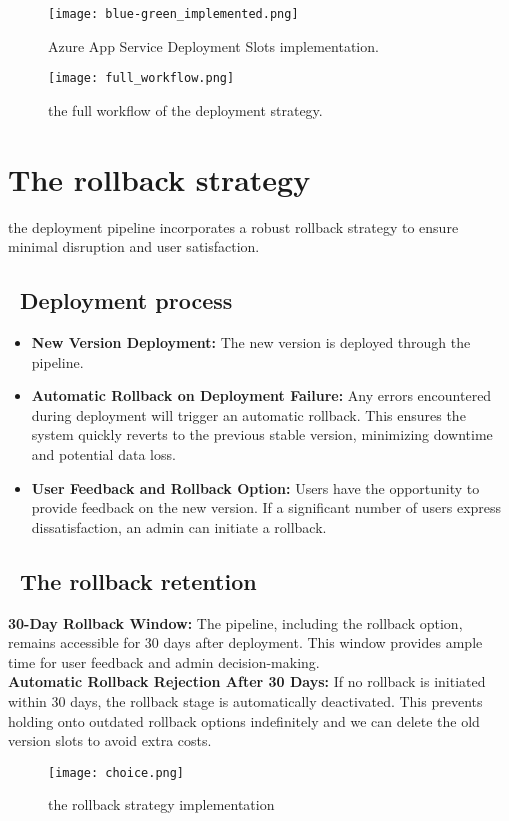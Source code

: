 \begin{figure}[H]
    \centering
    \texttt{[image: blue-green\_implemented.png]}
    \caption{Azure App Service Deployment Slots implementation.}
    \label{fig:deployment-slots}
\end{figure}

\begin{figure}[H]
    \centering
    \texttt{[image: full\_workflow.png]}
    \caption{the full workflow of the deployment strategy.}
    \label{fig:deployment-strategy-full-workflow}
\end{figure}

\pagebreak
\section{The rollback strategy}
the deployment pipeline incorporates a robust rollback strategy to ensure minimal disruption and user satisfaction.
\subsection*{ \textbullet\ Deployment process}

\begin{itemize}
    \item \textbf{New Version Deployment:} The new version is deployed through the pipeline.
    \item \textbf{Automatic Rollback on Deployment Failure:} Any errors encountered during deployment will trigger an automatic rollback. This ensures the system quickly reverts to the previous stable version, minimizing downtime and potential data loss.
    \item \textbf{User Feedback and Rollback Option:} Users have the opportunity to provide feedback on the new version. If a significant number of users express dissatisfaction, an admin can initiate a rollback.
\end{itemize}

\subsection*{ \textbullet\ The rollback retention}
\textbf{30-Day Rollback Window:}
The pipeline, including the rollback option, remains accessible for 30 days after deployment. This window provides ample time for user feedback and admin decision-making.
\\ \noindent
\textbf{Automatic Rollback Rejection After 30 Days:}
If no rollback is initiated within 30 days, the rollback stage is automatically deactivated. This prevents holding onto outdated rollback options indefinitely and we can delete the old version slots to avoid extra costs.
\\
\begin{figure}[H]
    \centering
    \texttt{[image: choice.png]}
    \caption{the rollback strategy implementation}
    \label{fig:rollback-strategy}
\end{figure}

